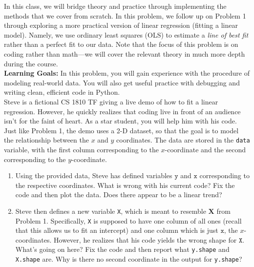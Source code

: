 \documentclass{../harvardml}
\theoremstyle{definition}
\theoremstyle{plain}
\begin{document}
\newpage 

\begin{problem} 
In this class, we will bridge theory and practice through implementing the methods that we cover from scratch. In this problem, we follow up on Problem 1 through exploring a more practical version of linear regression (fitting a linear model). Namely, we use ordinary least squares (OLS) to estimate a \textit{line of best fit} rather than a perfect fit to our data. Note that the focus of this problem is on coding rather than math---we will cover the relevant theory in much more depth during the course.\\

\noindent \textbf{Learning Goals:} In this problem, you will gain experience with the procedure of modeling real-world data. You will also get useful practice with debugging and writing clean, efficient code in Python. \\

\noindent Steve is a fictional CS 1810 TF giving a live demo of how to fit a linear regression. However, he quickly realizes that coding live in front of an audience isn't for the faint of heart. As a star student, you will help him with his code. Just like Problem 1, the demo uses a 2-D dataset, so that the goal is to model the relationship between the $x$ and $y$ coordinates. The data are stored in the \texttt{data} variable, with the first column corresponding to the $x$-coordinate and the second corresponding to the $y$-coordinate. 

\begin{enumerate}
    \item Using the provided data, Steve has defined variables $\texttt{y}$ and $\texttt{x}$ corresponding to the respective coordinates.  What is wrong with his current code? Fix the code and then plot the data. Does there appear to be a linear trend?

    \item Steve then defines a new variable \texttt{X}, which is meant to resemble $\bm X$ from Problem 1. Specifically, \texttt{X} is supposed to have one column of all ones (recall that this allows us to fit an intercept) and one column which is just $\texttt{x}$, the $x$-coordinates. However, he realizes that his code yields the wrong shape for $\texttt{X}$. What's going on here? Fix the code and then report what \texttt{y.shape} and \texttt{X.shape} are. Why is there no second coordinate in the output for \texttt{y.shape}?
    

\end{enumerate}
\end{problem}
\end{document}

